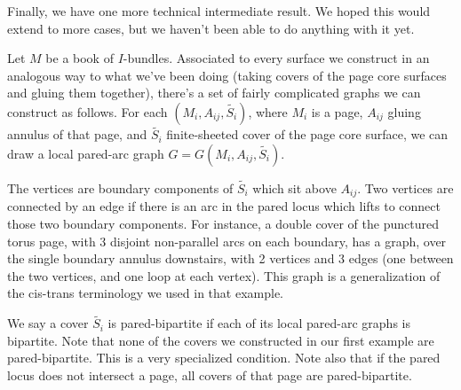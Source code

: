 \documentclass[12pt]{amsart}
\theoremstyle{definition}
\begin{document}
Finally, we have one more technical intermediate result. We hoped this would
extend to more cases, but we haven't been able to do anything with it yet.

Let $M$ be a book of $I$-bundles. Associated to every surface we construct in
an analogous way to what we've been doing (taking covers of the page core
surfaces and gluing them together), there's a set of fairly complicated graphs
we can construct as follows. For each $(M_i,A_{ij},\widetilde{S_i})$, where
$M_i$ is a page, $A_{ij}$ gluing annulus of that page, and $\widetilde{S_i}$
finite-sheeted cover of the page core surface, we can draw a local pared-arc
graph $G=G(M_i,A_{ij},\widetilde{S_i})$.

The vertices are boundary components of $\widetilde{S_i}$ which sit above
$A_{ij}$. Two vertices are connected by an edge if there is an arc in the pared
locus which lifts to connect those two boundary components. For instance,
a double cover of the punctured torus page, with 3 disjoint non-parallel arcs
on each boundary, has a graph, over the single boundary annulus downstairs,
with 2 vertices and 3 edges (one between the two vertices, and one loop at each
vertex). This graph is a generalization of the cis-trans terminology we used in
that example.

We say a cover $\widetilde{S_i}$ is pared-bipartite if each of its local
pared-arc graphs is bipartite. Note that none of the covers we constructed in
our first example are pared-bipartite. This is a very specialized condition.
Note also that if the pared locus does not intersect a page, all covers of that
page are pared-bipartite.
\end{document}
